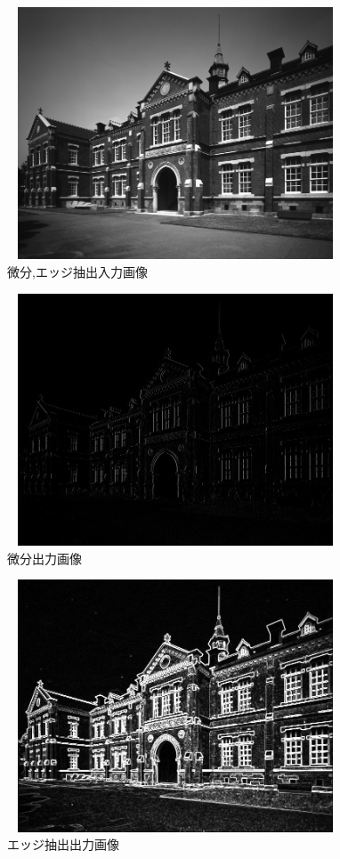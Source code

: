 \documentclass[11pt,a4j]{jsarticle}
\begin{document}
    \begin{figure}[H]
      \centering
      \includegraphics[clip,width=10.0cm ,height= 7.5cm]{./img/diff_edge/diff_edge_source.png}
      \caption{微分,エッジ抽出入力画像\label{fig:diff_source}}
    \end{figure}
    \begin{figure}[H]
      \centering
      \includegraphics[clip,width=10.0cm ,height= 7.5cm]{./img/diff_edge/diff.png}
      \caption{微分出力画像\label{fig:diff_result}}
    \end{figure}

    \begin{figure}[H]
      \centering
      \includegraphics[clip,width=10.0cm ,height= 7.5cm]{./img/diff_edge/edge.png}
      \caption{エッジ抽出出力画像\label{fig:edge_detect_result}}
    \end{figure}
\end{document}
